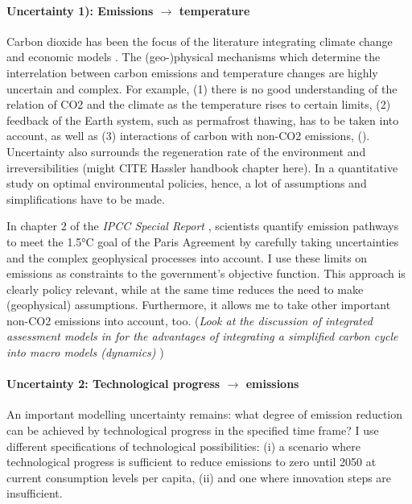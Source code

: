 \paragraph{Uncertainty 1): Emissions $\rightarrow$ temperature}
Carbon dioxide has been the focus of the literature integrating climate change and economic models \citep[such as,][]{Golosov2014OptimalEquilibrium,Barrage2019OptimalPolicy}. 
The (geo-)physical mechanisms which determine the interrelation between carbon emissions and temperature changes are highly uncertain and complex. For example, (1) there is no good understanding of the relation of CO2 and the climate as the temperature rises to certain limits, (2)  feedback of the Earth system, such as permafrost thawing, has to be taken into account, as well as (3) interactions of carbon with non-CO2 emissions, (\citep[][p.96, 2nd paragraph]{Rogelj2018MitigationDevelopment.}).  Uncertainty also surrounds the regeneration rate of the environment \citep{Acemoglu2012TheChange} and irreversibilities (might CITE Hassler handbook chapter here). In a quantitative study on optimal environmental policies, hence, a lot of assumptions and simplifications have to be made. 

In chapter 2 of the
\textit{IPCC Special Report} \citep{Rogelj2018MitigationDevelopment.}, scientists quantify emission pathways to meet the 1.5°C goal of the Paris Agreement by carefully taking uncertainties and the complex geophysical processes into account. I use these limits on emissions as constraints to the government's objective function. This approach is clearly policy relevant, while at the same time reduces the need to make (geophysical) assumptions. Furthermore, it allows me to take other important non-CO2 emissions into account, too. (\textit{Look at the discussion of integrated assessment models in \cite{Hassler2016EnvironmentalMacroeconomics} for the advantages of integrating a simplified carbon cycle into macro models (\ar dynamics) })

\paragraph{Uncertainty 2: Technological progress $\rightarrow$ emissions}
An important modelling uncertainty remains: what degree of emission reduction can be achieved by technological progress in the specified time frame? I use different specifications of technological possibilities: (i) a scenario where technological progress is sufficient to reduce emissions to zero until 2050 at current consumption levels per capita, (ii) and one where innovation steps are insufficient.

